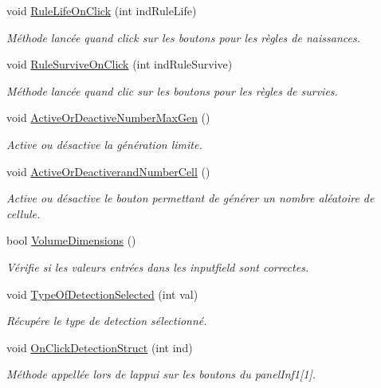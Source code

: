 \begin{DoxyCompactItemize}
void \mbox{\hyperlink{class_parameters_ae90c0f90420620d98950ac50b9f24782}{Rule\+Life\+On\+Click}} (int ind\+Rule\+Life)
\begin{DoxyCompactList}\small\item\em Méthode lancée quand click sur les boutons pour les règles de naissances. \end{DoxyCompactList}\item 
void \mbox{\hyperlink{class_parameters_af62c0383d55e0653fcd2384b9d49d42f}{Rule\+Survive\+On\+Click}} (int ind\+Rule\+Survive)
\begin{DoxyCompactList}\small\item\em Méthode lancée quand clic sur les boutons pour les règles de survies. \end{DoxyCompactList}\item 
void \mbox{\hyperlink{class_parameters_a1db238650db0f62fade69c0da51a0e83}{Active\+Or\+Deactive\+Number\+Max\+Gen}} ()
\begin{DoxyCompactList}\small\item\em Active ou désactive la génération limite. \end{DoxyCompactList}\item 
void \mbox{\hyperlink{class_parameters_af21422abe34305567b0d9ef4982c9ea8}{Active\+Or\+Deactiverand\+Number\+Cell}} ()
\begin{DoxyCompactList}\small\item\em Active ou désactive le bouton permettant de générer un nombre aléatoire de cellule. \end{DoxyCompactList}\item 
bool \mbox{\hyperlink{class_parameters_a92f68fa9992b1066153a6175dd37dc36}{Volume\+Dimensions}} ()
\begin{DoxyCompactList}\small\item\em Vérifie si les valeurs entrées dans les inputfield sont correctes. \end{DoxyCompactList}\item 
void \mbox{\hyperlink{class_parameters_aea7e3963fed0681d7a9f756a5deb52d1}{Type\+Of\+Detection\+Selected}} (int val)
\begin{DoxyCompactList}\small\item\em Récupére le type de detection sélectionné. \end{DoxyCompactList}\item 
void \mbox{\hyperlink{class_parameters_ad62219d943618c3b970a46239ae443ae}{On\+Click\+Detection\+Struct}} (int ind)
\begin{DoxyCompactList}\small\item\em Méthode appellée lors de l\textquotesingle{}appui sur les boutons du panel\+Inf1\mbox{[}1\mbox{]}. \end{DoxyCompactList}\item 

\end{DoxyCompactItemize}
